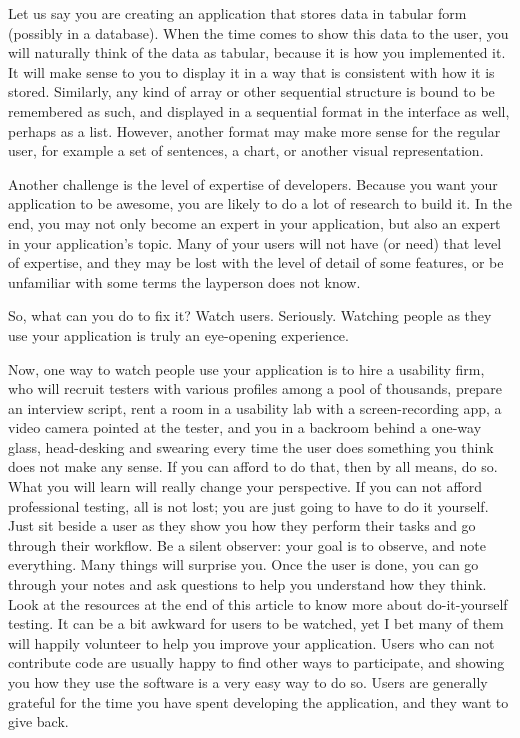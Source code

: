 Let us say you are creating an application that stores data in tabular form (possibly in a database). When the time comes to show this data to the user, you will naturally think of the data as tabular, because it is how you implemented it. It will make sense to you to display it in a way that is consistent with how it is stored. Similarly, any kind of array or other sequential structure is bound to be remembered as such, and displayed in a sequential format in the interface as well, perhaps as a list. However, another format may make more sense for the regular user, for example a set of sentences, a chart, or another visual representation.

Another challenge is the level of expertise of developers. Because you want your application to be awesome, you are likely to do a lot of research to build it. In the end, you may not only become an expert in your application, but also an expert in your application's topic. Many of your users will not have (or need) that level of expertise, and they may be lost with the level of detail of some features, or be unfamiliar with some terms the layperson does not know.

So, what can you do to fix it? Watch users. Seriously. Watching people as they use your application is truly an eye-opening experience.

Now, one way to watch people use your application is to hire a usability firm, who will recruit testers with various profiles among a pool of thousands, prepare an interview script, rent a room in a usability lab with a screen-recording app, a video camera pointed at the tester, and you in a backroom behind a one-way glass, head-desking and swearing every time the user does something you think does not make any sense. If you can afford to do that, then by all means, do so. What you will learn will really change your perspective. If you can not afford professional testing, all is not lost; you are just going to have to do it yourself. Just sit beside a user as they show you how they perform their tasks and go through their workflow. Be a silent observer: your goal is to observe, and note everything. Many things will surprise you. Once the user is done, you can go through your notes and ask questions to help you understand how they think. Look at the resources at the end of this article to know more about do-it-yourself testing. It can be a bit awkward for users to be watched, yet I bet many of them will happily volunteer to help you improve your application. Users who can not contribute code are usually happy to find other ways to participate, and showing you how they use the software is a very easy way to do so. Users are generally grateful for the time you have spent developing the application, and they want to give back.

